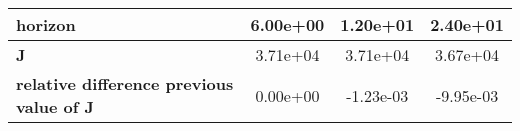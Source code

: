 \begin{tiny}\begin{tabular}{|l|c|c|c|}
\hline
\textbf{horizon}&6.00e+00&1.20e+01&2.40e+01\\\hline
\textbf{J}&3.71e+04&3.71e+04&3.67e+04\\\hline
\textbf{relative difference previous value of J}&0.00e+00&-1.23e-03&-9.95e-03\\\hline
\end{tabular}
\end{tiny}
